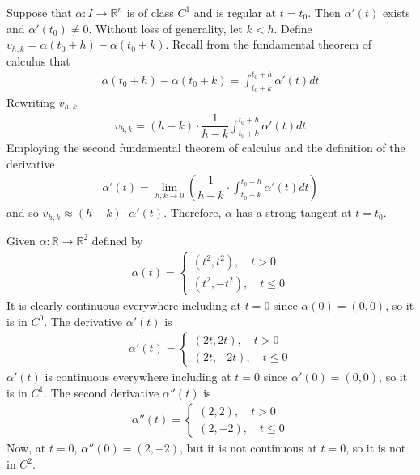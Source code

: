 \documentclass{article}
\newcommand{\R}{\mathbb{R}}
\begin{document}
	Suppose that $\alpha \colon I \to \R^n$ is of class $C^1$ and is regular at $t = t_0$. Then $\alpha'(t)$ exists and $\alpha'(t_0) \neq 0$. Without loss of generality, let $k < h$. Define $v_{h, k} = \alpha(t_0 + h) - \alpha(t_0 + k)$. Recall from the fundamental theorem of calculus that
	\begin{gather*}
		\alpha(t_0 + h) - \alpha(t_0 + k) = \int_{t_0 + k}^{t_0 + h} \alpha'(t) dt
	\end{gather*}
	Rewriting $v_{h, k}$
	\begin{gather*}
		v_{h, k} = (h - k) \cdot \dfrac{1}{h - k} \int_{t_0 + k}^{t_0 + h} \alpha'(t) dt
	\end{gather*}
	Employing the second fundamental theorem of calculus and the definition of the derivative
	\begin{gather*}
		\alpha'(t) = \lim_{h,k \to 0} \left( \dfrac{1}{h - k} \cdot \int_{t_0 + k}^{t_0 + h} \alpha'(t) dt \right)
	\end{gather*}
	and so $v_{h, k} \approx (h - k) \cdot \alpha'(t)$. Therefore, $\alpha$ has a strong tangent at $t = t_0$.

	Given  $\alpha \colon \R \to \R^2$ defined by
	\begin{gather*}
		\alpha(t) = \begin{cases}
			(t^2, t^2), \quad t > 0 \\
			(t^2, -t^2), \quad t \leq 0
		\end{cases}
	\end{gather*}
	It is clearly continuous everywhere including at $t = 0$ since $\alpha(0) = (0, 0)$, so it is in $C^0$. The derivative $\alpha'(t)$ is
	\begin{gather*}
		\alpha'(t) = \begin{cases}
			(2t, 2t), \quad t > 0 \\
			(2t, -2t), \quad t \leq 0
		\end{cases}
	\end{gather*}
	$\alpha'(t)$ is continuous everywhere including at $t = 0$ since $\alpha'(0) = (0, 0)$, so it is in $C^1$. The second derivative $\alpha''(t)$ is
	\begin{gather*}
		\alpha''(t) = \begin{cases}
			(2, 2), \quad t > 0 \\
			(2, -2), \quad t \leq 0
		\end{cases}
	\end{gather*}
	Now, at $t = 0$, $\alpha''(0) = (2, -2)$, but it is not continuous at $t = 0$, so it is not in $C^2$.
	
\end{document}
